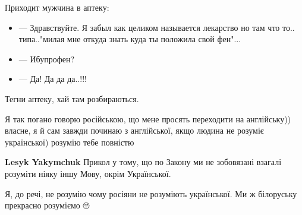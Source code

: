 \begin{itemize}
 
Приходит мужчина в аптеку:

\begin{itemize}
  \item — Здравствуйте. Я забыл как целиком называется лекарство но там что то.. типа.."милая мне откуда знать куда ты положила свой фен"...
  \item — Ибупрофен?
  \item — Да! Да да да..!!!
\end{itemize}


 
Тегни аптеку, хай там розбираються.

 

Я так погано говорю російською, що мене просять переходити на англійську))
власне, я й сам завжди починаю з англійської, якщо людина не розуміє
української) розумію тебе повністю

\begin{itemize}
 
\textbf{Lesyk Yakymchuk} Прикол у тому, що по Закону ми не зобовязані взагалі розуміти ніяку іншу Мову, окрім Української.

 
Я, до речі, не розумію чому росіяни не розуміють української. Ми ж білоруську прекрасно розуміємо 🙄


\end{itemize}
\end{itemize}
